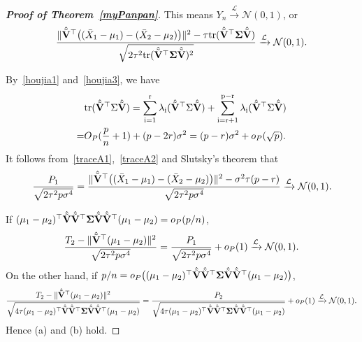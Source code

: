 \documentclass[times,sort&compress,3p]{elsarticle}
\newcommand{\mytr}{\rm tr}
\theoremstyle{plain}
\theoremstyle{definition}
\theoremstyle{remark}
\begin{document}
\begin{appendices}
\begin{proof}[\textbf{Proof of Theorem~\ref{myPanpan}}]
This means $Y_n\xrightarrow{\mathcal{L}}\mathcal{N}(0,1)$, or
$$
\frac{\|\hat{\tilde{\mathbf{V}}}^\top \big((\bar{X}_1-\mu_1)-(\bar{X}_2-\mu_2)\big)\|^2-\tau\mathrm{tr}(\hat{\tilde{\mathbf{V}}}^\top \boldsymbol{\Sigma}\hat{\tilde{\mathbf{V}}})}{\sqrt{2\tau^2\mathrm{tr}(\hat{\tilde{\mathbf{V}}}^\top \boldsymbol{\Sigma}\hat{\tilde{\mathbf{V}}})^2}}\xrightarrow{\mathcal{L}}\mathcal{N}(0,1).
$$


By~\eqref{houjia1} and~\eqref{houjia3}, we have
\begin{equation}\label{traceA2}
    \begin{aligned}
        &\mytr(\hat{\tilde{\BV}}^\top \bSigma\hat{\tilde{\BV}})=
    \sum_{i=1}^r \lambda_i(\hat{\tilde{\BV}}^\top \bSigma\hat{\tilde{\BV}})
    +
    \sum_{i=r+1}^{p-r} \lambda_i(\hat{\tilde{\BV}}^\top \bSigma\hat{\tilde{\BV}})\\
        =&
    O_P(\frac{p}{n}+1)+(p-2r)\sigma^2
        =
        (p-r)\sigma^2+o_P(\sqrt{p}).
    \end{aligned}
\end{equation}
It follows from~\eqref{traceA1},~\eqref{traceA2} and Slutsky's theorem that
$$
\frac{P_1}{\sqrt{2\tau^2 p\sigma^4}}=
\frac{\|\hat{\tilde{\mathbf{V}}}^\top \big((\bar{X}_1-\mu_1)-(\bar{X}_2-\mu_2)\big)\|^2-\sigma^2\tau(p-r) }{\sqrt{2\tau^2 p\sigma^4}}\xrightarrow{\mathcal{L}}\mathcal{N}(0,1).
$$

If $(\mu_1-\mu_2)^\top  \hat{\tilde{\mathbf{V}}}\hat{\tilde{\mathbf{V}}}^\top  \boldsymbol{\Sigma}\hat{\tilde{\mathbf{V}}}\hat{\tilde{\mathbf{V}}}^\top  (\mu_1-\mu_2)=o_P(p/n)$,
$$
\frac{T_2-\|\hat{\tilde{\mathbf{V}}}^\top  (\mu_1-\mu_2)\|^2}{\sqrt{2\tau^2 p \sigma^4}}
=
\frac{P_1}{\sqrt{2\tau^2 p \sigma^4}}+o_P(1)\xrightarrow{\mathcal{L}}\mathcal{N}(0,1).
$$
On the other hand, if $p/n=o_P\big((\mu_1-\mu_2)^\top  \hat{\tilde{\mathbf{V}}}\hat{\tilde{\mathbf{V}}}^\top  \boldsymbol{\Sigma}\hat{\tilde{\mathbf{V}}}\hat{\tilde{\mathbf{V}}}^\top  (\mu_1-\mu_2)\big)$,
$$
\frac{T_2-\|\hat{\tilde{\mathbf{V}}}^\top  (\mu_1-\mu_2)\|^2}{\sqrt{4\tau (\mu_1-\mu_2)^\top  \hat{\tilde{\mathbf{V}}}\hat{\tilde{\mathbf{V}}}^\top  \boldsymbol{\Sigma}\hat{\tilde{\mathbf{V}}}\hat{\tilde{\mathbf{V}}}^\top  (\mu_1-\mu_2)}}
=
\frac{P_2}{\sqrt{4\tau (\mu_1-\mu_2)^\top  \hat{\tilde{\mathbf{V}}}\hat{\tilde{\mathbf{V}}}^\top  \boldsymbol{\Sigma}\hat{\tilde{\mathbf{V}}}\hat{\tilde{\mathbf{V}}}^\top  (\mu_1-\mu_2)}}+o_P(1)\xrightarrow{\mathcal{L}}\mathcal{N}(0,1).
$$
Hence (a) and (b) hold.


\end{proof}
\end{appendices}
\end{document}
